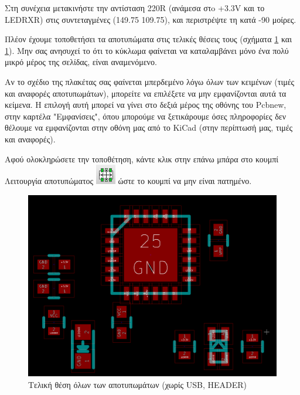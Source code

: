 \documentclass[a4paper]{article}
\begin{document}
Στη συνέχεια μετακινήστε την αντίσταση 220R (ανάμεσα στo +3.3V και το LEDRXR) στις συντεταγμένες (149.75 109.75), και περιστρέψτε τη κατά -90 μοίρες. 

Πλέον έχουμε τοποθετήσει τα αποτυπώματα στις τελικές θέσεις τους (σχήματα \ref{fig:pcb-circ-allmodzoom} και \ref{fig:pcb-circ-allmodzoom}). Μην σας ανησυχεί το ότι το κύκλωμα φαίνεται να καταλαμβάνει μόνο ένα πολύ μικρό μέρος της σελίδας, είναι αναμενόμενο.

Αν το σχέδιο της πλακέτας σας φαίνεται μπερδεμένο λόγω όλων των κειμένων (τιμές και αναφορές αποτυπωμάτων), μπορείτε να επιλέξετε να μην εμφανίζονται αυτά τα κείμενα. Η επιλογή αυτή μπορεί να γίνει στο δεξιά μέρος της οθόνης του Pcbnew, στην καρτέλα "Εμφανίσεις", όπου μπορούμε να ξετικάρουμε όσες πληροφορίες δεν θέλουμε να εμφανίζονται στην οθόνη μας από το KiCad (στην περίπτωσή μας, τιμές και αναφορές).

Αφού ολοκληρώσετε την τοποθέτηση, κάντε κλικ στην επάνω μπάρα στο κουμπί Λειτουργία αποτυπώματος \includegraphics[scale=.5]{img/pcb-ico-footmod.png} ώστε το κουμπί να μην είναι πατημένο.


\begin{figure}
  \begin{center}
    \includegraphics[width=.9\textwidth]{img/pcb-circ-allmodzoom.png}
    \caption{Τελική θέση όλων των αποτυπωμάτων (χωρίς USB, HEADER)}
    \label{fig:pcb-circ-allmodzoom}
  \end{center}
\end{figure}
 
\end{document}
